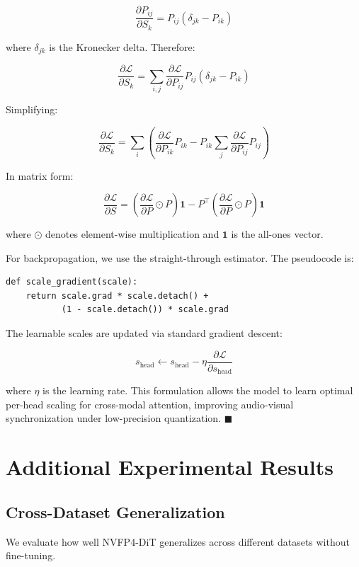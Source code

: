 \documentclass[journal]{IEEEtran}
\theoremstyle{definition}
\theoremstyle{remark}
\begin{document}
\[
\frac{\partial P_{ij}}{\partial S_k} = P_{ij}(\delta_{jk} - P_{ik})
\]

where $\delta_{jk}$ is the Kronecker delta. Therefore:

\[
\frac{\partial \mathcal{L}}{\partial S_k} = \sum_{i,j} \frac{\partial \mathcal{L}}{\partial P_{ij}} P_{ij}(\delta_{jk} - P_{ik})
\]

Simplifying:

\[
\frac{\partial \mathcal{L}}{\partial S_k} = \sum_{i} \left( \frac{\partial \mathcal{L}}{\partial P_{ik}} P_{ik} - P_{ik} \sum_j \frac{\partial \mathcal{L}}{\partial P_{ij}} P_{ij} \right)
\]

In matrix form:

\[
\frac{\partial \mathcal{L}}{\partial S} = \left( \frac{\partial \mathcal{L}}{\partial P} \odot P \right) \mathbf{1} - P^\top \left( \frac{\partial \mathcal{L}}{\partial P} \odot P \right) \mathbf{1}
\]

where $\odot$ denotes element-wise multiplication and $\mathbf{1}$ is the all-ones vector.

For backpropagation, we use the straight-through estimator. The pseudocode is:

\begin{verbatim}
def scale_gradient(scale):
    return scale.grad * scale.detach() + 
           (1 - scale.detach()) * scale.grad
\end{verbatim}

The learnable scales are updated via standard gradient descent:

\[
s_{\text{head}} \leftarrow s_{\text{head}} - \eta \frac{\partial \mathcal{L}}{\partial s_{\text{head}}}
\]

where $\eta$ is the learning rate. This formulation allows the model to learn optimal per-head scaling for cross-modal attention, improving audio-visual synchronization under low-precision quantization. \hfill $\blacksquare$

\section{Additional Experimental Results}
\label{app:d}

\subsection{Cross-Dataset Generalization}

We evaluate how well NVFP4-DiT generalizes across different datasets without fine-tuning.
\end{document}
